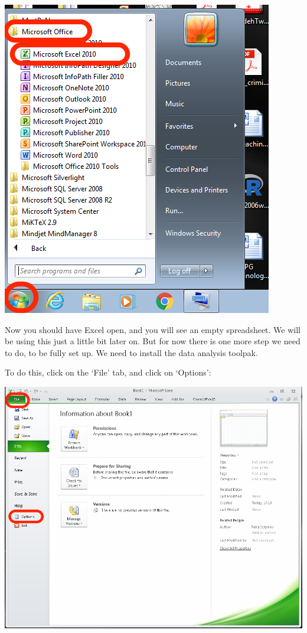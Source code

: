\documentclass[]{book}
\theoremstyle{definition}
\theoremstyle{definition}
\theoremstyle{definition}
\theoremstyle{remark}
\begin{document}
\includegraphics{imgs/open_excel.png}

Now you should have Excel open, and you will see an empty spreadsheet.
We will be using this just a little bit later on. But for now there is
one more step we need to do, to be fully set up. We need to install the
data analysis toolpak.

To do this, click on the `File' tab, and click on `Options':

\includegraphics{imgs/file_tab_options.png}
\end{document}
